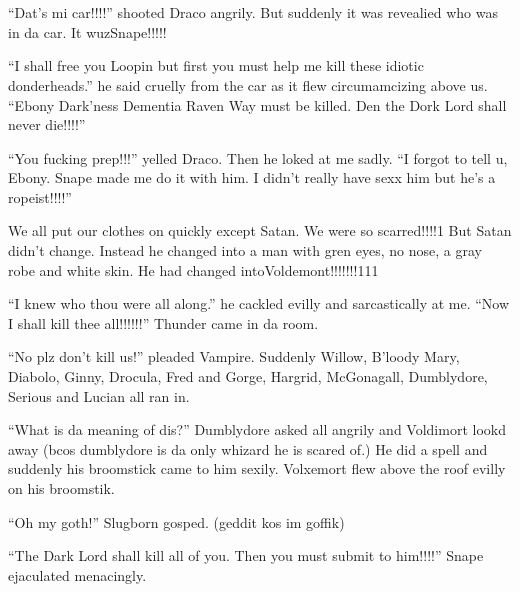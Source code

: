 \section{\chaptername~\thesection}



\enquote{Dat's mi car!!!!} shooted Draco angrily. But suddenly it was revealied who was in da car. It wuz\dotfill Snape!!!!!

\enquote{I shall free you Loopin but first you must help me kill these idiotic donderheads.} he said cruelly from the car as it flew circumamcizing above us. \enquote{Ebony Dark'ness Dementia Raven Way must be killed. Den the Dork Lord shall never die!!!!}

\enquote{You fucking prep!!!} yelled Draco. Then he loked at me sadly. \enquote{I forgot to tell u, Ebony. Snape made me do it with him. I didn't really have sexx him but he's a ropeist!!!!}

We all put our clothes on quickly except Satan. We were so scarred!!!!1 But Satan didn't change. Instead he changed into a man with gren eyes, no nose, a gray robe and white skin. He had changed into\dotfill Voldemont!!!!!!!111

\enquote{I knew who thou were all along.} he cackled evilly and sarcastically at me. \enquote{Now I shall kill thee all!!!!!!} Thunder came in da room.

\enquote{No plz don't kill us!} pleaded Vampire. Suddenly Willow, B'loody Mary, Diabolo, Ginny, Drocula, Fred and Gorge, Hargrid, McGonagall, Dumblydore, Serious and Lucian all ran in.

\enquote{What is da meaning of dis?} Dumblydore asked all angrily and Voldimort lookd away (bcos dumblydore is da only whizard he is scared of.) He did a spell and suddenly his broomstick came to him sexily. Volxemort flew above the roof evilly on his broomstik.

\enquote{Oh my goth!} Slugborn gosped. (geddit kos im goffik)

\enquote{The Dark Lord shall kill all of you. Then you must submit to him!!!!} Snape ejaculated menacingly.

